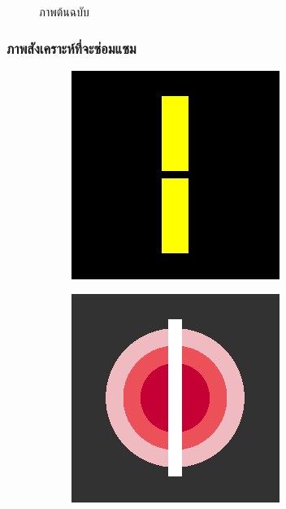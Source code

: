 \documentclass[xcolor=dvipsnames, xetex,serif]{beamer}
\numberwithin{equation}{section}
\begin{document}
\begin{frame}
\begin{figure}[H]
\begin{subfigure}{0.3\linewidth}
				\end{subfigure}
				\caption{ภาพต้นฉบับ}
			\end{figure}
		\end{frame}
		\begin{frame}
			\frametitle{ภาพสังเคราะห์ที่จะซ่อมแซม}
			\begin{figure}[H]
				\centering
				\begin{subfigure}{0.3\linewidth}
					\centering
					\includegraphics[width=0.7\linewidth]{images/image_inpaint_synthetic/case01-toinpaint.png}
				\end{subfigure}
				\begin{subfigure}{0.3\linewidth}
					\centering
					\includegraphics[width=0.7\linewidth]{images/image_inpaint_synthetic/case02-toinpaint.png}
				\end{subfigure}

\end{figure}
\end{frame}
\end{document}

